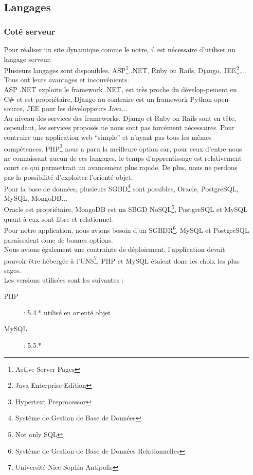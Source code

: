 \documentclass{sigplanconf}
\begin{document}
\subsection{Langages}
\subsubsection{Coté serveur}
Pour réaliser un site dynamique comme le notre, il est nécessaire d'utiliser un langage serveur.\\
Plusieurs langages sont disponibles, ASP\footnote{Active Server Pages} .NET, Ruby on Rails, Django, JEE\footnote{Java Enterprise Edition},... Tous ont leurs avantages et inconvénients.\\
ASP .NET exploite le framework .NET, est très proche du dévelop-pement en C\# et est propriétaire, Django au contraire est un framework Python open-source, JEE pour les développeurs Java...\\
Au niveau des services des frameworks, Django et Ruby on Rails sont en tête, cependant, les services proposés ne nous sont pas forcément nécessaires. Pour contruire une application web ``simple'' et n'ayant pas tous les mêmes compétences, PHP\footnote{Hypertext Preprocessor} nous a paru la meilleure option car, pour ceux d'entre nous ne connaissant aucun de ces langages, le temps d'apprentissage est relativement court ce qui permettrait un avancement plus rapide. De plus, nous ne perdons pas la possibilité d'exploiter l'orienté objet.\\

Pour la base de données, plusieurs SGBD\footnote{Système de Gestion de Base de Données} sont possibles, Oracle, PostgreSQL, MySQL, MongoDB...\\
Oracle est propriétaire, MongoDB est un SBGD NoSQL\footnote{Not only SQL}, PostgreSQL et MySQL quant à eux sont libre et relationnel.\\
Pour notre application, nous avions besoin d'un SGBDR\footnote{Système de Gestion de Base de Données Relationnelles}, MySQL et PostgreSQL paraissaient donc de bonnes options.\\

Nous avions également une contrainte de déploiement, l'application devait pouvoir être hébergée à l'UNS\footnote{Université Nice Sophia Antipolis}, PHP\cite{urlPHP} et MySQL\cite{urlMySQL} étaient donc les choix les plus sages.\\
Les versions utilisées sont les suivantes : 
\begin{description}
\item [PHP] : 5.4.* utilisé en orienté objet
\item [MySQL] : 5.5.*
\end{description}
\end{document}
